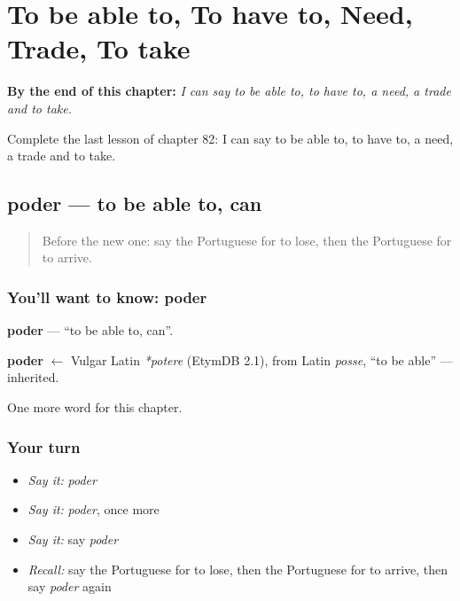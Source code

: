 
\chapter{To be able to, To have to, Need, Trade, To take}
\label{ch:pt-to-be-able-to-to-have-to-need-trade-to-take}

\begin{chapteropening}
\textbf{By the end of this chapter:} \emph{I can say to be able to, to have to, a need, a trade and to take.}

Complete the last lesson of chapter 82: I can say to be able to, to have to, a need, a trade and to take.
\end{chapteropening}

\section[poder]{poder — to be able to, can}

\label{lesson:PT-C82-poder}



\begin{quote}
Before the new one: say the Portuguese for to lose, then the Portuguese for to arrive.
\end{quote}

\subsection*{You'll want to know: poder}
\textbf{poder} — \textquotedblleft{}to be able to, can\textquotedblright{}.

\begin{cousinweb}
\textbf{poder} $\leftarrow$ Vulgar Latin \emph{*potere} (EtymDB 2.1), from Latin \emph{posse}, \textquotedblleft{}to be able\textquotedblright{} — inherited.
\end{cousinweb}

\begin{grammarlens}[title={What you've built}]
One more word for this chapter.
\end{grammarlens}

\subsection*{Your turn}
\begin{itemize}
\raggedright
  \item \emph{Say it:} \emph{poder}
  \item \emph{Say it:} \emph{poder}, once more
  \item \emph{Say it:} say \emph{poder}
  \item \emph{Recall:} say the Portuguese for to lose, then the Portuguese for to arrive, then say \emph{poder} again
\end{itemize}


